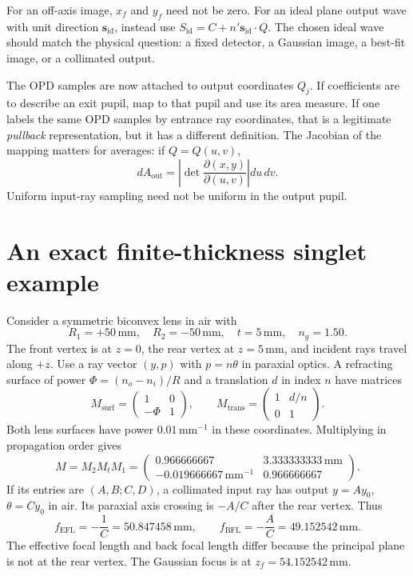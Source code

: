 For an off-axis image, $x_f$ and $y_f$ need not be zero. For an ideal
plane output wave with unit direction $\bm s_{\mathrm{id}}$, instead use
$S_{\mathrm{id}}=C+n'\bm s_{\mathrm{id}}\cdot Q$.
The chosen ideal wave should match the physical question: a fixed
detector, a Gaussian image, a best-fit image, or a collimated output.

The OPD samples are now attached to output coordinates $Q_j$.
If coefficients are to describe an exit pupil, map to that pupil and
use its area measure. If one labels the same OPD samples by entrance
ray coordinates, that is a legitimate \emph{pullback} representation,
but it has a different definition. The Jacobian of the mapping matters
for averages: if $Q=Q(u,v)$,
\begin{equation}
 dA_{\mathrm{out}}=
 \left|\det\frac{\partial(x,y)}{\partial(u,v)}\right|du\,dv.
\end{equation}
Uniform input-ray sampling need not be uniform in the output pupil.

\section{An exact finite-thickness singlet example}
Consider a symmetric biconvex lens in air with
\begin{equation}
 R_1=+50\,\mathrm{mm},\quad R_2=-50\,\mathrm{mm},\quad
 t=5\,\mathrm{mm},\quad n_g=1.50.
\end{equation}
The front vertex is at $z=0$, the rear vertex at $z=5\,\mathrm{mm}$,
and incident rays travel along $+z$. Use a ray vector $(y,p)$ with
$p=n\theta$ in paraxial optics. A refracting surface of power
$\Phi=(n_o-n_i)/R$ and a translation $d$ in index $n$ have matrices
\begin{equation}
 M_{\mathrm{surf}}=\begin{pmatrix}1&0\\-\Phi&1\end{pmatrix},
 \qquad
 M_{\mathrm{trans}}=\begin{pmatrix}1&d/n\\0&1\end{pmatrix}.
\end{equation}
Both lens surfaces have power $0.01\,\mathrm{mm}^{-1}$ in these
coordinates. Multiplying in propagation order gives
\begin{equation}
 M=M_2M_tM_1=
 \begin{pmatrix}
 0.966666667&3.333333333\,\mathrm{mm}\\
 -0.019666667\,\mathrm{mm}^{-1}&0.966666667
 \end{pmatrix}.
\end{equation}
If its entries are $(A,B;C,D)$, a collimated input ray has output
$y=Ay_0$, $\theta=Cy_0$ in air. Its paraxial axis crossing is
$-A/C$ after the rear vertex. Thus
\begin{equation}
 f_{\mathrm{EFL}}=-\frac1C=50.847458\,\mathrm{mm},\qquad
 f_{\mathrm{BFL}}=-\frac AC=49.152542\,\mathrm{mm}.
\end{equation}
The effective focal length and back focal length differ because the
principal plane is not at the rear vertex. The Gaussian focus is at
$z_f=54.152542\,\mathrm{mm}$.

